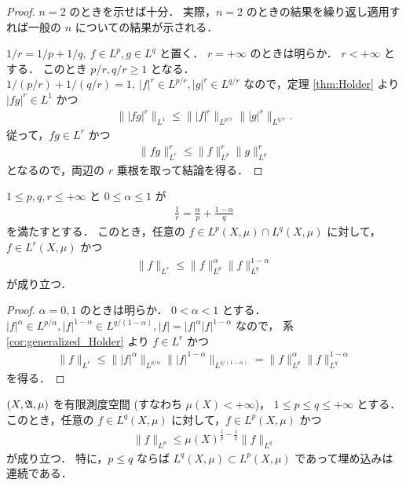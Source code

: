 \begin{proof}
    $n=2$ のときを示せば十分．
    実際，$n=2$ のときの結果を繰り返し適用すれば一般の $n$ についての結果が示される．

    $1/r=1/p+1/q,\ f\in L^p,g\in L^q$ と置く．
    $r=+\infty$ のときは明らか．
    $r<+\infty$ とする．
    このとき $p/r,q/r\ge1$ となる．
    $1/(p/r)+1/(q/r)=1,\ |f|^r\in L^{p/r},|g|^r\in L^{q/r}$ なので，定理 \ref{thm:Holder} より
    $|fg|^r\in L^1$ かつ
    \begin{align*}
        \||fg|^r\|_{L^1}
        \le\||f|^r\|_{L^{p/r}}\||g|^r\|_{L^{q/r}}.
    \end{align*}
    従って，$fg\in L^r$ かつ
    \begin{align*}
        \|fg\|_{L^r}^r
        \le\|f\|_{L^p}^r\|g\|_{L^q}^r
    \end{align*}
    となるので，両辺の $r$ 乗根を取って結論を得る．
\end{proof}

\begin{corollary}[補間不等式]\label{cor:Holder_interpolation}
    $1\le p,q,r\le+\infty$ と $0\le\alpha\le1$ が
    \begin{align*}
        \frac{1}{r}=\frac{\alpha}{p}+\frac{1-\alpha}{q}
    \end{align*}
    を満たすとする．
    このとき，任意の $f\in L^p(X,\mu)\cap L^q(X,\mu)$ に対して，$f\in L^r(X,\mu)$ かつ
    \begin{align*}
        \|f\|_{L^r}\le\|f\|_{L^p}^\alpha\|f\|_{L^q}^{1-\alpha}
    \end{align*}
    が成り立つ．
\end{corollary}

\begin{proof}
    $\alpha=0,1$ のときは明らか．
    $0<\alpha<1$ とする．
    $|f|^\alpha\in L^{p/\alpha},|f|^{1-\alpha}\in L^{q/(1-\alpha)},|f|=|f|^\alpha|f|^{1-\alpha}$ なので，
    系 \ref{cor:generalized_Holder} より $f\in L^r$ かつ
    \begin{align*}
        \|f\|_{L^r}
        \le\||f|^\alpha\|_{L^{p/\alpha}}\||f|^{1-\alpha}\|_{L^{q/(1-\alpha)}}
        =\|f\|_{L^p}^\alpha\|f\|_{L^q}^{1-\alpha}
    \end{align*}
    を得る．
\end{proof}

\begin{corollary}\label{cor:Lp_inclusion}
    $(X,\mathfrak{A},\mu)$ を有限測度空間 (すなわち $\mu(X)<+\infty$)，
    $1\le p\le q\le+\infty$ とする．
    このとき，任意の $f\in L^q(X,\mu)$ に対して，$f\in L^p(X,\mu)$ かつ
    \begin{align*}
        \|f\|_{L^p}\le\mu(X)^{\frac{1}{p}-\frac{1}{q}}\|f\|_{L^q}
    \end{align*}
    が成り立つ．
    特に，$p\le q$ ならば $L^q(X,\mu)\subset L^p(X,\mu)$ であって埋め込みは連続である．
\end{corollary}

